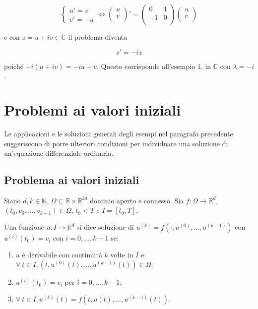 \documentclass[hidelinks, 10pt]{report}
\begin{document}
\begin{enumerate}
\[
\begin{cases}
u' = v \\
v' = -u
\end{cases} \iff \begin{pmatrix}
	u \\
	v \\
\end{pmatrix} ' = \begin{pmatrix}
	 0 & 1 \\
	-1 & 0 \\
\end{pmatrix} \begin{pmatrix}
	u \\
	v \\
\end{pmatrix}
\]

e con $ z = u + iv \in \mathbb{C} $ il problema diventa

\[ z' = -i z \]

poich\'e $ -i(u + iv) = -i u + v $. Questo corrisponde all'esempio $ 1. $ in $ \mathbb{C} $ con $ \lambda = -i $.
\end{enumerate}

\section{Problemi ai valori iniziali}
Le applicazioni e le soluzioni generali degli esempi nel paragrafo precedente suggeriscono di porre ulteriori condizioni per individuare una soluzione di un'equazione differenziale ordinaria.

\subsection{Problema ai valori iniziali}
Siano $ d, k \in \mathbb{N} $, $ \Omega \subseteq \mathbb{R} \times \mathbb{R}^{kd} $ dominio aperto e connesso. Sia $ f: \Omega \to \mathbb{R}^{d} $, $ (t_{0}, v_{0}, \dotsc, v_{k-1}) \in \overline\Omega $, $ t_{0} < T $ e $ I = [t_{0}, T] $.

Una funzione $ u: I \to \mathbb{R}^{d} $ si dice soluzione di $ u^{(k)} = f(\cdot, u^{(0)}, \dotsc, u^{(k-1)}) $ con $ u^{(i)} (t_{0}) = v_{i} $ con $ i = 0, \dotsc, k - 1 $ se:
\begin{enumerate}
\item $ u $ \`e derivabile con continuit\`a $ k $ volte in $ I $ e $ \forall\ t \in I, \left( t, u^{(0)}(t), \dotsc, u^{(k-1)}(t) \right) \in \Omega $;
\item $ u^{(i)} (t_{0}) = v_{i} $ per $ i = 0, \dotsc, k - 1 $;
\item $ \forall\ t \in I, u^{(k)}(t) = f \left( t, u(t), \dotsc, u^{(k-1)}(t) \right) $.
\end{enumerate}
\end{document}
